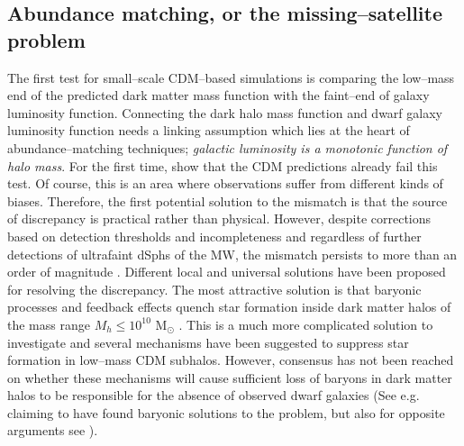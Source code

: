 \documentclass[a4wide,12pt]{book}
\begin{document}
\subsection{Abundance matching, or the missing--satellite problem}
\label{subsec:missing-satellite}
The first test for small--scale CDM--based simulations is comparing the low--mass end of the predicted dark matter mass function with the faint--end of galaxy luminosity function. Connecting the dark halo mass function and dwarf galaxy luminosity function needs a linking assumption which lies at the heart of abundance--matching techniques; \emph{galactic luminosity is a monotonic function of halo mass}. For the first time, \citet[][]{Klypin+1999, Moore+1999} show that the CDM predictions already fail this test. Of course, this is an area where observations suffer from different kinds of biases. Therefore, the first potential solution to the mismatch is that the source of discrepancy is practical rather than physical. However, despite corrections based on detection thresholds and incompleteness and regardless of further detections of ultrafaint dSphs of the MW, the mismatch persists to more than an order of magnitude \citep[See e.g.][]{Pawlowski+2015}. Different local and universal solutions have been proposed for resolving the discrepancy. The most attractive solution is that baryonic processes and feedback effects quench star formation inside dark matter halos of the mass range $M_h \leq 10^{10} $ $\mathrm{M}_{\odot} $ . This is a much more complicated solution to investigate and several mechanisms have been suggested to suppress star formation in low--mass CDM subhalos. However, consensus has not been reached on whether these mechanisms will cause sufficient loss of baryons in dark matter halos to be responsible for the absence of observed dwarf galaxies (See e.g. \citet{Brooks+2013, Sawala+2014, DelPopolo+2014, Sawala+2015} claiming to have found baryonic solutions to the problem, but also for opposite arguments see \citealt{Bullock+2010, Klypin+2015}).
 
\end{document}
